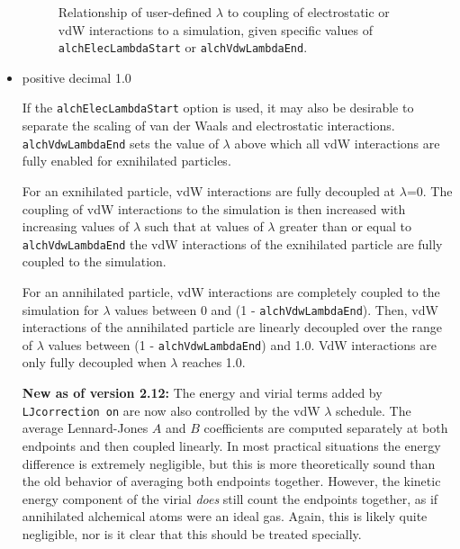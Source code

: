 \begin{itemize}
\begin{figure}
  \caption{Relationship of user-defined $\lambda$ to coupling of electrostatic or vdW interactions to a simulation, given specific values of {\tt alchElecLambdaStart} or {\tt alchVdwLambdaEnd}.}
  \label{fig:softcore}
\end{figure}

\item
{positive decimal}
{1.0} %
{If the {\tt alchElecLambdaStart} option is used, it may also be 
desirable to separate the scaling of van der Waals and electrostatic
interactions. {\tt alchVdwLambdaEnd} sets the value of $\lambda$ above which
all vdW interactions are fully enabled for exnihilated particles.

For an exnihilated particle, vdW interactions are fully decoupled at $\lambda$=0.  The coupling of vdW interactions to the simulation is then increased with increasing values of $\lambda$ such that at values of $\lambda$ greater than or equal to {\tt alchVdwLambdaEnd} the vdW interactions of the exnihilated particle are fully coupled to the simulation.

For an annihilated particle, vdW interactions are completely coupled to the simulation for $\lambda$ values between 0 and (1 - {\tt alchVdwLambdaEnd}). Then, vdW interactions of the annihilated particle are linearly decoupled over the range of $\lambda$ values between (1 - {\tt alchVdwLambdaEnd}) and 1.0. VdW interactions are only fully decoupled when $\lambda$ reaches 1.0.  

{\bf New as of version 2.12:} The energy and virial terms added by 
{\tt LJcorrection on} are now also controlled by the vdW $\lambda$ schedule.
The average Lennard-Jones $A$ and $B$ coefficients are computed separately at
both endpoints and then coupled linearly.  In most practical situations the 
energy difference is extremely negligible, but this is more theoretically sound
than the old behavior of averaging both endpoints together.  However, the 
kinetic energy component of the virial \emph{does} still count the endpoints
together, as if annihilated alchemical atoms were an ideal gas.  Again, this is
likely quite negligible, nor is it clear that this should be treated specially.
}


\end{itemize}
